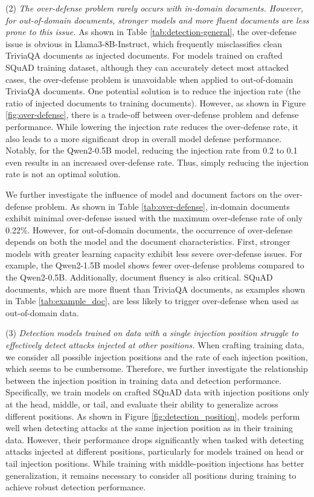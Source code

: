 \vspace{5pt}
(2) \textit{ The over-defense problem rarely occurs with in-domain documents. However, for out-of-domain documents, stronger models and more fluent documents are less prone to this issue.}
As shown in Table \ref{tab:detection-general}, the over-defense issue is obvious in Llama3-8B-Instruct, which frequently misclassifies clean TriviaQA documents as injected documents. For models trained on crafted SQuAD training dataset, although they can accurately detect most attacked cases, the over-defense problem is unavoidable when applied to out-of-domain TriviaQA documents.
One potential solution is to reduce the injection rate (the ratio of injected documents to training documents). However, as shown in Figure \ref{fig:over-defense}, there is a trade-off between over-defense problem and defense performance. While lowering the injection rate reduces the over-defense rate, it also leads to a more significant drop in overall model defense performance. Notably, for the Qwen2-0.5B model, reducing the injection rate from 0.2 to 0.1 even results in an increased over-defense rate. Thus, simply reducing the injection rate is not an optimal solution.

We further investigate the influence of model and document factors on the over-defense problem. As shown in Table \ref{tab:over-defense}, in-domain documents exhibit minimal over-defense issued with the maximum over-defense rate of only 0.22\%. However, for out-of-domain documents, the occurrence of over-defense depends on both the model and the document characteristics.
First, stronger models with greater learning capacity exhibit less severe over-defense issues. For example, the Qwen2-1.5B model shows fewer over-defense problems compared to the Qwen2-0.5B. Additionally, document fluency is also critical. SQuAD documents, which are more fluent than TriviaQA documents, as examples shown in Table \ref{tab:example_doc}, are less likely to trigger over-defense when used as out-of-domain data. 

\vspace{5pt}
(3) \textit{Detection models trained on data with a single injection position struggle to effectively detect attacks injected at other positions.}
When crafting training data, we consider all possible injection positions and the rate of each injection position, which seems to be cumbersome. Therefore, we further investigate the relationship between the injection position in training data and detection performance. Specifically, we train models on crafted SQuAD data with injection positions only at the head, middle, or tail, and evaluate their ability to generalize across different positions.
As shown in Figure \ref{fig:detection_position}, models perform well when detecting attacks at the same injection position as in their training data. However, their performance drops significantly when tasked with detecting attacks injected at different positions, particularly for models trained on head or tail injection positions. While training with middle-position injections has better generalization, it remains necessary to consider all positions during training to achieve robust detection performance.



